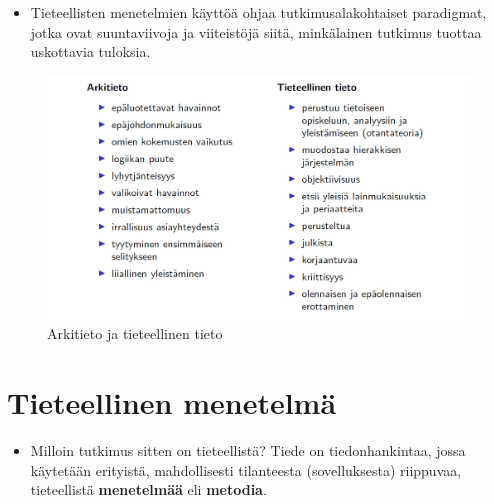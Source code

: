\documentclass[
]{book}
\providecommand{\tightlist}{%
  \setlength{\itemsep}{0pt}\setlength{\parskip}{0pt}}
\begin{document}
\begin{itemize}
\begin{itemize}
    \begin{itemize}
    \tightlist
    \item
      Tieteellisten menetelmien käyttöä ohjaa tutkimusalakohtaiset paradigmat, jotka ovat suuntaviivoja ja viiteistöjä siitä, minkälainen tutkimus tuottaa uskottavia tuloksia.
    \end{itemize}
  \end{itemize}
\end{itemize}

\begin{figure}

{\centering \includegraphics[width=1\linewidth]{images/Arkitieto-tieteellinentieto} 

}

\caption{Arkitieto ja tieteellinen tieto}\label{fig:arki}
\end{figure}

\hypertarget{alaluku22}{%
\section{Tieteellinen menetelmä}\label{alaluku22}}

\begin{itemize}
\tightlist
\item
  Milloin tutkimus sitten on tieteellistä? Tiede on tiedonhankintaa, jossa käytetään erityistä, mahdollisesti tilanteesta (sovelluksesta) riippuvaa, tieteellistä \textbf{menetelmää} eli \textbf{metodia}.
\end{itemize}
\end{document}
